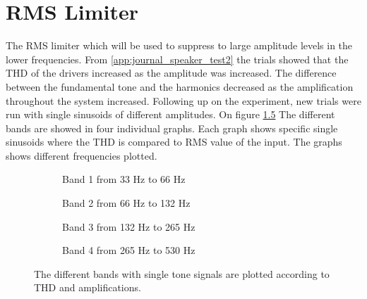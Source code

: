 \chapter{RMS Limiter}\label{cha:CompressorDesign}
The RMS limiter which will be used to suppress to large amplitude levels in the lower frequencies. 
From \autoref{app:journal_speaker_test2} the trials showed that the THD of the drivers increased as the amplitude was increased. The difference between the fundamental tone and the harmonics decreased as the amplification throughout the system increased. Following up on the experiment, new trials were run with single sinusoids of different amplitudes. On figure \ref{fig:THDComparissonRMS} The different bands are showed in four individual graphs. Each graph shows specific single sinusoids where the THD is compared to RMS value of the input. The graphs shows different frequencies plotted. 

\begin{figure}[H]
	\centering
	\begin{subfigure}[t]{0.45\textwidth}
		\centering
		
		\caption{Band 1 from 33 Hz to 66 Hz}
		\label{fig:Band1ModelRMS}
	\end{subfigure}
	\begin{subfigure}[t]{0.45\textwidth}
		\centering
		
		\caption{Band 2 from 66 Hz to 132 Hz}
		\label{fig:Band2ModelRMS}
	\end{subfigure}
	\begin{subfigure}[t]{0.45\textwidth}
		\centering
		
		\caption{Band 3 from 132 Hz to 265 Hz}
		\label{fig:Band3ModelRMS}
	\end{subfigure}
	\begin{subfigure}[t]{0.45\textwidth}
		\centering
		
		\caption{Band 4 from 265 Hz to 530 Hz}
		\label{fig:Band4ModelRMS}
	\end{subfigure}
	\caption{The different bands with single tone signals are plotted according to THD and amplifications.}
	\label{fig:THDComparissonRMS}
\end{figure} 

